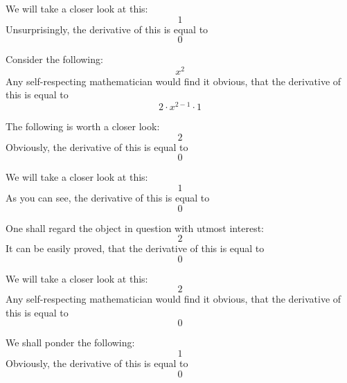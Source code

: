 \documentclass{article}
\begin{document}
We will take a closer look at this:
\begin{equation}
1 
\end{equation}
Unsurprisingly, the derivative of this is equal to
\begin{equation}
0 
\end{equation}

Consider the following:
\begin{equation}
x ^{2 } 
\end{equation}
Any self-respecting mathematician would find it obvious, that the derivative of this is equal to
\begin{equation}
2 \cdot x ^{2 - 1 } \cdot 1 
\end{equation}

The following is worth a closer look:
\begin{equation}
2 
\end{equation}
Obviously, the derivative of this is equal to
\begin{equation}
0 
\end{equation}

We will take a closer look at this:
\begin{equation}
1 
\end{equation}
As you can see, the derivative of this is equal to
\begin{equation}
0 
\end{equation}

One shall regard the object in question with utmost interest:
\begin{equation}
2 
\end{equation}
It can be easily proved, that the derivative of this is equal to
\begin{equation}
0 
\end{equation}

We will take a closer look at this:
\begin{equation}
2 
\end{equation}
Any self-respecting mathematician would find it obvious, that the derivative of this is equal to
\begin{equation}
0 
\end{equation}

We shall ponder the following:
\begin{equation}
1 
\end{equation}
Obviously, the derivative of this is equal to
\begin{equation}
0 
\end{equation}
\end{document}
